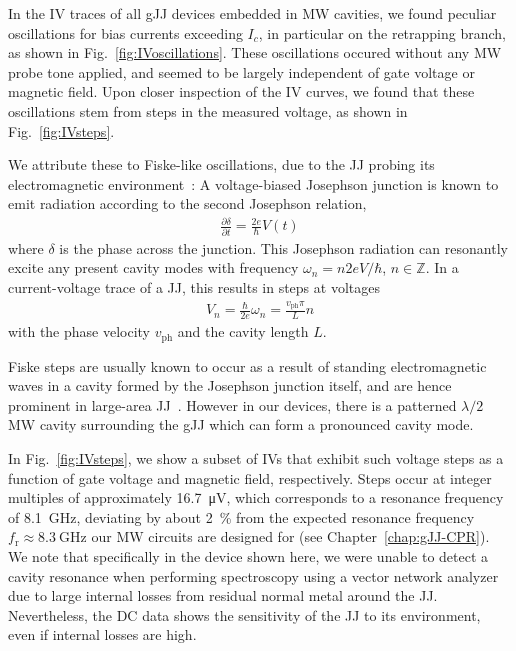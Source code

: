 In the IV traces of all gJJ devices embedded in MW cavities, we found peculiar oscillations for bias currents exceeding $I_c$, in particular on the retrapping branch, as shown in Fig.~\ref{fig:IVoscillations}.
%
These oscillations occured without any MW probe tone applied, and seemed to be largely independent of gate voltage or magnetic field.
%
Upon closer inspection of the IV curves, we found that these oscillations stem from steps in the measured voltage, as shown in Fig.~\ref{fig:IVsteps}.

We attribute these to Fiske-like oscillations, due to the JJ probing its electromagnetic environment~\cite{fiskeTemperatureMagneticField1964,eckSelfDetectionAcJosephson1964,coonJosephsonAcStep1965}:
%
A voltage-biased Josephson junction is known to emit radiation according to the second Josephson relation,
%
\begin{align}
\frac{\partial \delta}{\partial t}=\frac{2e}{\hbar}V(t)
\end{align}
%
where $\delta$ is the phase across the junction.
%
This Josephson radiation can resonantly excite any present cavity modes with frequency $\omega_n=n2eV/\hbar$, $n\in\mathbb{Z}$.
%
In a current-voltage trace of a JJ, this results in steps at voltages
%
\begin{align}
V_n=\frac{\hbar}{2e}\omega_n=\frac{v_\text{ph}\pi}{L}n
\end{align}
%
with the phase velocity $v_\text{ph}$ and the cavity length $L$.

Fiske steps are usually known to occur as a result of standing electromagnetic waves in a cavity formed by the Josephson junction itself, and are hence prominent in large-area JJ~\cite{krasnovFiskeStepsIntrinsic1999,yabukiSupercurrentVanWaals2016b,liHighQualityEpitaxialMgB22017}.
%
However in our devices, there is a patterned $\lambda/2$ MW cavity surrounding the gJJ which can form a pronounced cavity mode.


In Fig.~\ref{fig:IVsteps}, we show a subset of IVs that exhibit such voltage steps as a function of gate voltage and magnetic field, respectively.
%
Steps occur at integer multiples of approximately \SI{16.7}{\micro\volt}, which corresponds to a resonance frequency of \SI{8.1}{\giga\hertz}, deviating by about \SI{2}{\percent} from the expected resonance frequency $f_\text{r}\approx\SI{8.3}{\giga\hertz}$ our MW circuits are designed for (see Chapter~\ref{chap:gJJ-CPR}).
%
We note that specifically in the device shown here, we were unable to detect a cavity resonance when performing spectroscopy using a vector network analyzer due to large internal losses from residual normal metal around the JJ.
%
Nevertheless, the DC data shows the sensitivity of the JJ to its environment, even if internal losses are high.

